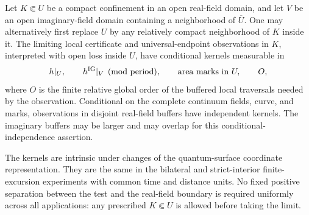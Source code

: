 \begin{theorem}
\label{loc:spatial-kernels}
Let $K\Subset U$ be a compact confinement in an open real-field domain,
and let $V$ be an open imaginary-field domain containing a neighborhood
of $\overline U$.  One may alternatively first replace $U$ by any
relatively compact neighborhood of $K$ inside it.  The limiting local
certificate and universal-endpoint observations in $K$, interpreted with
open loss inside $U$, have conditional kernels measurable in
\begin{equation}\label{loc:local-sigma-field}
 h|_U,\qquad h^{\rm IG}|_V\pmod{\text{period}},\qquad
 \text{area marks in }U,\qquad O,
\end{equation}
where $O$ is the finite relative global order of the buffered local
traversals needed by the observation.  Conditional on the complete
continuum fields, curve, and marks, observations in disjoint real-field
buffers have independent kernels.  The imaginary buffers may be larger
and may overlap for this conditional-independence assertion.

The kernels are intrinsic under changes of the quantum-surface
coordinate representation.  They are the same in the bilateral and
strict-interior finite-excursion experiments with common time and distance
units.  No fixed positive separation between the test and the real-field
boundary is required uniformly across all applications: any prescribed
$K\Subset U$ is allowed before taking the limit.
\end{theorem}
